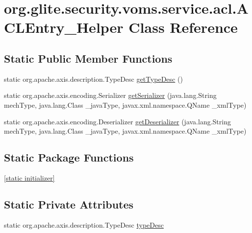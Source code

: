 \hypertarget{classorg_1_1glite_1_1security_1_1voms_1_1service_1_1acl_1_1ACLEntry__Helper}{
\section{org.glite.security.voms.service.acl.ACLEntry\_\-Helper Class Reference}
\label{classorg_1_1glite_1_1security_1_1voms_1_1service_1_1acl_1_1ACLEntry__Helper}
}
\subsection*{Static Public Member Functions}
\begin{DoxyCompactItemize}
\item 
static org.apache.axis.description.TypeDesc \hyperlink{classorg_1_1glite_1_1security_1_1voms_1_1service_1_1acl_1_1ACLEntry__Helper_a53c9824ad44ef0cbc42cd5c32d63c6fb}{getTypeDesc} ()
\item 
static org.apache.axis.encoding.Serializer \hyperlink{classorg_1_1glite_1_1security_1_1voms_1_1service_1_1acl_1_1ACLEntry__Helper_a4c9bf5b1efb38d33d467204b4b4cc842}{getSerializer} (java.lang.String mechType, java.lang.Class \_\-javaType, javax.xml.namespace.QName \_\-xmlType)
\item 
static org.apache.axis.encoding.Deserializer \hyperlink{classorg_1_1glite_1_1security_1_1voms_1_1service_1_1acl_1_1ACLEntry__Helper_a47a80087d9d2328fc6d6d67edafb8ed2}{getDeserializer} (java.lang.String mechType, java.lang.Class \_\-javaType, javax.xml.namespace.QName \_\-xmlType)
\end{DoxyCompactItemize}
\subsection*{Static Package Functions}
\begin{DoxyCompactItemize}
\item 
\hyperlink{classorg_1_1glite_1_1security_1_1voms_1_1service_1_1acl_1_1ACLEntry__Helper_ae791be7052f4292cdb9dd3e61c1ca342}{\mbox{[}static initializer\mbox{]}}
\end{DoxyCompactItemize}
\subsection*{Static Private Attributes}
\begin{DoxyCompactItemize}
\item 
static org.apache.axis.description.TypeDesc \hyperlink{classorg_1_1glite_1_1security_1_1voms_1_1service_1_1acl_1_1ACLEntry__Helper_ab8674c22678411d9692af37ad4c9b01f}{typeDesc}
\end{DoxyCompactItemize}


